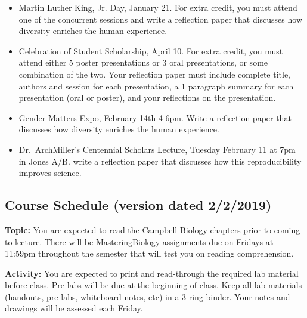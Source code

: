 \documentclass{tufte-handout}
\begin{document}
\begin{fullwidth}
\begin{itemize}
\item Martin Luther King, Jr. Day, January 21. For extra credit, you must attend one of the concurrent sessions and write a reflection paper that discusses how diversity enriches the human experience. 
\item Celebration of Student Scholarship, April 10.  For extra credit, you must attend either 5 poster presentations or 3 oral presentations, or some combination of the two.  Your reflection paper must include complete title, authors and session for each presentation, a 1 paragraph summary for each presentation (oral or poster), and your reflections on the presentation.  	
\item Gender Matters Expo, February 14th 4-6pm. Write a reflection paper that discusses how diversity enriches the human experience.
\item Dr.\ ArchMiller's Centennial Scholars Lecture, Tuesday February 11 at 7pm in Jones A/B. write a reflection paper that discusses how this reproducibility improves science.
\end{itemize}









\newpage
\subsection{Course Schedule (version dated 2/2/2019)}
%

\textbf{Topic:} You are expected to read the Campbell Biology chapters prior to coming to lecture.  There will be MasteringBiology assignments due on Fridays at 11:59pm throughout the semester that will test you on reading comprehension. 

\textbf{Activity:} You are expected to print and read-through the required lab material before class. Pre-labs will be due at the beginning of class. Keep all lab materials (handouts, pre-labs, whiteboard notes, etc) in a 3-ring-binder. Your notes and drawings will be assessed each Friday.


\end{fullwidth}
\end{document}
